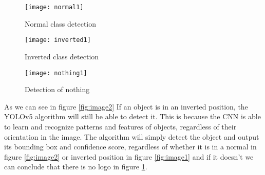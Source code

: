 \begin{itemize}
\FloatBarrier

\begin{figure}[htbp]
    \centering
    
    \begin{minipage}{0.3\textwidth}
        \centering
        \texttt{[image: normal1]}
        \caption{Normal class detection}
        \label{fig:image1}
    \end{minipage}
    \hfill
    \begin{minipage}{0.3\textwidth}
        \centering
        \texttt{[image: inverted1]}
        \caption{Inverted class detection}
        \label{fig:image2}
    \end{minipage}
    \hfill
    \begin{minipage}{0.3\textwidth}
        \centering
        \texttt{[image: nothing1]}
        \caption{Detection of nothing}
        \label{fig:image3}
    \end{minipage}

    
\end{figure}
\FloatBarrier
As we can see in figure \ref{fig:image2} If an object is in an inverted position, the YOLOv5 algorithm will still be able to detect it. This is because the CNN is able to learn and recognize patterns and features of objects, regardless of their orientation in the image. The algorithm will simply detect the object and output its bounding box and confidence score, regardless of whether it is in a normal  in figure \ref{fig:image2}  or inverted position  in figure \ref{fig:image1} and if it doesn't we can conclude that there is no logo  in figure \ref{fig:image3}.\\
\FloatBarrier
\begin{figure}[htbp]

    


\end{figure}
\end{itemize}
